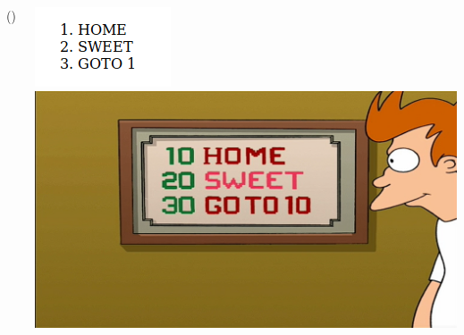 \begin{frame}
  \begin{columns}[c]
      \begin{exampleblock}{ ()}
        
      \end{exampleblock}
      \begin{center}
        \includegraphics[width=.8\textwidth]{futurama.png}
        \vfill
        \includegraphics[width=.8\textwidth]{futurama_orig.png}
      \end{center}
  \end{columns}
\end{frame}


